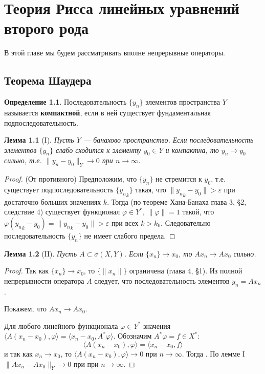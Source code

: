 \documentclass[12pt,a4paper,titlepage,oneside]{book}
\theoremstyle{definition}
\newtheorem*{definition}{Определение}
\theoremstyle{plain}
\theoremstyle{remark}
\theoremstyle{remark}
\theoremstyle{remark}
\theoremstyle{remark}
\theoremstyle{plain}
\newtheorem*{lemma}{Лемма}
\theoremstyle{plain}
\begin{document}
\chapter{Теория Рисса линейных уравнений второго рода}

В этой главе мы будем рассматривать вполне непрерывные операторы.

\section{Теорема Шаудера}

\begin{definition}
Последовательность $\{y_n\}$ элементов пространства $Y$ называется \textbf{компактной}, если в ней существует фундаментальная подпоследовательность.
\end{definition}

\begin{lemma}[I]
Пусть $Y$ --- банахово пространство. Если последовательность элементов $\{y_n\}$ слабо сходится к элементу $y_0 \in Y$ и компактна, то $y_n\to y_0$ сильно, т.е. \mbox{$\lVert y_n - y_0\rVert_Y\to 0$} при $n\to\infty$.
\end{lemma}

\begin{proof}
(От противного) Предположим, что $\{y_n\}$ не стремится к $y_0$, т.е. существует подпоследовательность $\{{y_n}_k\}$ такая, что $\lVert {y_n}_k-y_0\rVert > \varepsilon$ при достаточно больших значениях $k$. Тогда (по теореме Хана-Банаха глава 3, \S 2, следствие 4) существует функционал $\varphi\in Y^*$, $\lVert\varphi\rVert=1$ такой, что $\varphi({y_n}_k-y_0)=\lVert {y_n}_k-y_0\rVert > \varepsilon$ при всех $k > k_0$. Следовательно последовательность $\{y_n\}$ не имеет слабого предела.
\end{proof}

\begin{lemma}[II]
Пусть $A\subset\sigma(X,Y)$. Если $\{x_n\}\to x_0$, то $Ax_n\to Ax_0$ сильно.
\end{lemma}

\begin{proof}
Так как $\{x_n\}\to x_0$, то $\{\lVert x_n\rVert\}$ ограничена (глава 4, \S 1). Из полной непрерывности оператора $A$ следует, что последовательность элементов $y_n = Ax_n$ .

Покажем, что $Ax_n\to Ax_0$.

Для любого линейного функционала $\varphi\in Y^*$ значения $ \langle A(x_n-x_0), \varphi \rangle  =  \langle x_n-x_0, A^*\varphi \rangle $. Обозначим $A^*\varphi = f\in X^*$:
\begin{equation*}
 \langle A(x_n-x_0), \varphi \rangle  =  \langle x_n-x_0, f \rangle 
\end{equation*}
и так как $x_n\to x_0$, то $ \langle A(x_n-x_0), \varphi \rangle \to 0$ при $n\to\infty$. Тогда . По лемме I $\lVert Ax_n-Ax_0\rVert_Y\to 0$ при при $n\to\infty$.
\end{proof}
\end{document}
